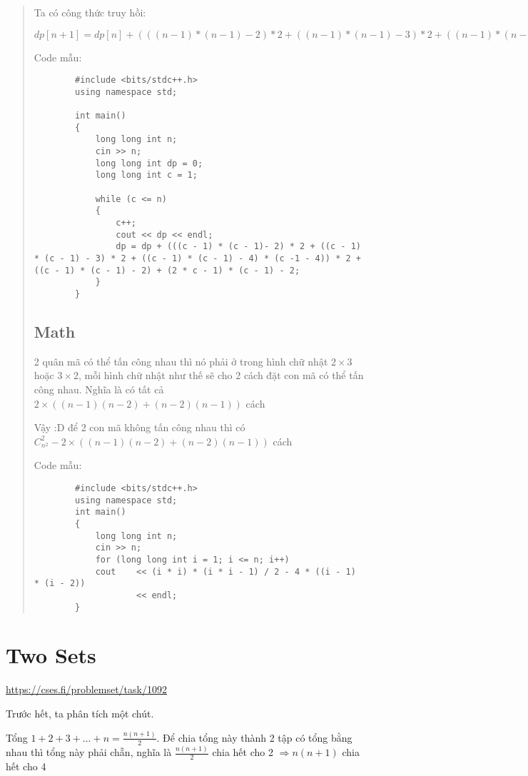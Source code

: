 \documentclass[10pt]{article}
\begin{document}
\begin{quote}
    Ta có công thức truy hồi:

    $ dp[n+1] = dp[n] + (((n - 1) * (n - 1) - 2) * 2 + ((n - 1) * (n - 1) - 3) * 2 + ((n - 1) * (n - 1) - 4) * (n - 1 - 4)) * 2 + ((n - 1) * (n - 1) - 2) + (2 * n - 1) * (n - 1) - 2 $

    Code mẫu:
    \begin{lstlisting}
        #include <bits/stdc++.h>
        using namespace std;

        int main()
        {
            long long int n;
            cin >> n;
            long long int dp = 0;
            long long int c = 1;

            while (c <= n)
            {
                c++;
                cout << dp << endl;
                dp = dp + (((c - 1) * (c - 1)- 2) * 2 + ((c - 1) * (c - 1) - 3) * 2 + ((c - 1) * (c - 1) - 4) * (c -1 - 4)) * 2 + ((c - 1) * (c - 1) - 2) + (2 * c - 1) * (c - 1) - 2;
            }
        }
    \end{lstlisting}

    \subsection{Math}
    2 quân mã có thể tấn công nhau thì nó phải ở trong hình chữ nhật $2 \times 3$ hoặc $3 \times 2$, mỗi hình chữ nhật như thế sẽ cho 2 cách đặt con mã có thể tấn công nhau. Nghĩa là có tất cả $2 \times ((n - 1)(n - 2) + (n - 2)(n - 1))$ cách

    Vậy :D để 2 con mã không tấn công nhau thì có $C^2_{n^2} - 2 \times ((n - 1)(n - 2) + (n - 2)(n - 1))$ cách

    Code mẫu:
    \begin{lstlisting}
        #include <bits/stdc++.h>
        using namespace std;
        int main()
        {
            long long int n;
            cin >> n;
            for (long long int i = 1; i <= n; i++)
            cout    << (i * i) * (i * i - 1) / 2 - 4 * ((i - 1) * (i - 2))
                    << endl;
        }
    \end{lstlisting}
\end{quote}
\section{Two Sets}
\url{https://cses.fi/problemset/task/1092}

Trước hết, ta phân tích một chút.

Tổng $1 + 2 + 3 + \ldots + n = \frac{n(n+1)}{2}$. Để chia tổng này thành 2 tập có tổng bằng nhau thì tổng này phải chẵn, nghĩa là $\frac{n(n+1)}{2}$ chia hết cho 2 $\Rightarrow n(n + 1)$ chia hết cho 4
\end{document}
